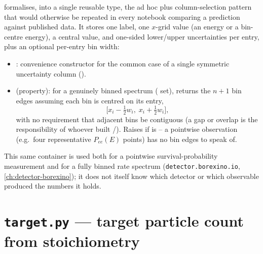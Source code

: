 \begin{implbox}
 formalises, into a single reusable type, the ad hoc
 plus column-selection pattern that would
otherwise be repeated in every notebook comparing a prediction against
published data. It stores one label, one $x$-grid value (an energy or a
bin-centre energy), a central value, and one-sided lower/upper
uncertainties per entry, plus an optional per-entry bin width:
\begin{itemize}
  \item {}: convenience constructor
    for the common case of a single symmetric uncertainty column
    ().
  \item {} (property): for a genuinely
    binned spectrum ( set), returns the $n+1$ bin
    edges assuming each bin is centred on its  entry,
    \begin{equation}
      \bigl[x_i - \tfrac12 w_i,\; x_i + \tfrac12 w_i\bigr],
    \end{equation}
    with no requirement that adjacent bins be contiguous (a gap or overlap
    is the responsibility of whoever built /).
    Raises if  is  -- a pointwise
    observation (e.g.\ four representative $P_{ee}(E)$ points) has no bin
    edges to speak of.
\end{itemize}
This same container is used both for a pointwise survival-probability
measurement and for a fully binned rate spectrum (\texttt{detector.borexino.io},
\cref{ch:detector-borexino}); it does not itself know which detector or
which observable produced the numbers it holds.
\end{implbox}

\section{\texttt{target.py} --- target particle count from stoichiometry}


